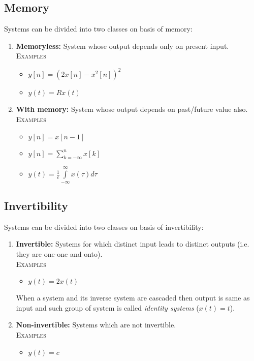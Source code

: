 \documentclass[oneside]{book}
\begin{document}
\subsection{Memory}
Systems can be divided into two classes on basis of memory:
\begin{enumerate}
	\item \textbf{Memoryless:} System whose output depends only on present input.\\
	      \textsc{Examples}
	      \begin{itemize}
		      \item \(y[n] = (2x[n] - x^2[n])^2\)
		      \item \(y(t) = Rx(t)\)
	      \end{itemize}
	\item \textbf{With memory:} System whose output depends on past/future value also.\\
	      \textsc{Examples}
	      \begin{itemize}
		      \item \(y[n] = x[n-1]\)
		      \item \(y[n] = \sum\limits_{k = -\infty}^n x[k]\)
		      \item \(y(t) = \frac{1}{c}\int\limits_{-\infty}^{\infty}x(\tau)d\tau\)
	      \end{itemize}
\end{enumerate}

\subsection{Invertibility}
Systems can be divided into two classes on basis of invertibility:
\begin{enumerate}
	\item \textbf{Invertible:} Systems for which distinct input leads to distinct outputs (i.e. they are one-one and onto).\\
	      \textsc{Examples}
	      \begin{itemize}
		      \item \(y(t) = 2 x(t)\)
	      \end{itemize}
	      When a system and its inverse system are cascaded then output is same as input and such group of system is called \textit{identity systems} (\(x(t) = t\)).
	\item \textbf{Non-invertible:} Systems which are not invertible.\\
	      \textsc{Examples}
	      \begin{itemize}
		      \item \(y(t) = c\)
	      \end{itemize}
\end{enumerate}
\end{document}
